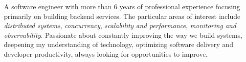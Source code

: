 

\begin{cvparagraph}

	A software engineer with more than 6 years of professional experience focusing primarily on building backend services. The particular areas of interest include {\textit{distributed systems}}, {\textit{concurrency}}, {\textit{scalability and performance}}, {\textit{monitoring and observability}}. Passionate about constantly improving the way we build systems, deepening my understanding of technology, optimizing software delivery and developer productivity, always looking for opportunities to improve.

\end{cvparagraph}
